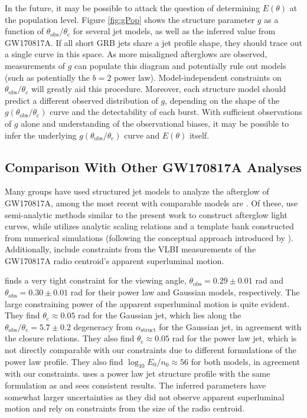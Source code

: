 \documentclass[twocolumn]{aastex62}
\newcommand{\gwbns}{GW170817A}
\newcommand{\thobs}{\ensuremath{\theta_{\mathrm{obs}}}}
\newcommand{\thC}{\ensuremath{\theta_{\mathrm{c}}}}
\begin{document}
In the future, it may be possible to attack the question of determining $E(\theta)$ at the population level.  Figure \ref{fig:gPop} shows the structure parameter $g$ as a function of $\thobs/\thC$ for several jet models, as well as the inferred value from \gwbns{}.  If all short GRB jets share a jet profile shape, they should trace out a single curve in this space.  As more misaligned afterglows are observed, measurements of $g$ can populate this diagram and potentially rule out models (such as potentially the $b=2$ power law).  Model-independent constraints on $\thobs/\thC$ will greatly aid this procedure.  Moreover, each structure model should predict a different observed distribution of $g$, depending on the shape of the $g(\thobs/\thC)$ curve and the detectability of each burst.  With sufficient observations of $g$ alone and understanding of the observational biases, it may be possible to infer the underlying $g(\thobs/\thC)$ curve and $E(\theta)$ itself.

\subsection{Comparison With Other \gwbns{} Analyses}

Many groups have used structured jet models to analyze the afterglow of \gwbns{}, among the most recent with comparable models are \citet{Hotokezaka:2018aa, Ghirlanda:2019aa, Lamb:2019aa, Wu:2018aa}.  Of these, \citet{Hotokezaka:2018aa, Ghirlanda:2019aa, Lamb:2019aa} use semi-analytic methods similar to the present work to construct afterglow light curves, while \citet{Wu:2018aa} utilizes analytic scaling relations and a template bank constructed from numerical simulations (following the conceptual approach introduced by \citet{van-Eerten:2012ac}).  Additionally, \citet{Hotokezaka:2018aa, Ghirlanda:2019aa} include constraints from the VLBI measurements of the \gwbns{} radio centroid's apparent superluminal motion.

\citet{Hotokezaka:2018aa} finds a very tight constraint for the viewing angle, $\thobs = 0.29 \pm 0.01$ rad and $\thobs = 0.30 \pm 0.01$ rad for their power law and Gaussian models, respectively.  The large constraining power of the apparent superluminal motion is quite evident.  They find $\thC \approx 0.05$ rad for the Gaussian jet, which lies along the $\thobs/\thC = 5.7\pm 0.2$ degeneracy from $\alpha_{\mathrm{struct}}$ for the Gaussian jet, in agreement with the closure relations.  They also find $\thC \approx 0.05$ rad for the power law jet, which is not directly comparable with our constraints due to different formulations of the power law profile.  They also find $\log_{10} E_0 / n_0 \approx 56$ for both models, in agreement with our constraints.  \citet{Ghirlanda:2019aa} uses a power law jet structure profile with the same formulation as \citet{Hotokezaka:2018aa} and sees consistent results.  The inferred parameters have somewhat larger uncertainties as they did not observe apparent superluminal motion and rely on constraints from the size of the radio centroid.
\end{document}
